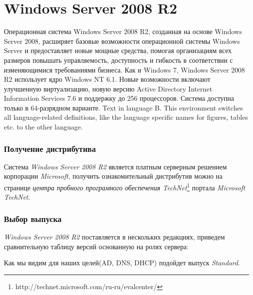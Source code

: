 \part{Windows Server 2008 R2}
Операционная система \foreignlanguage{english}{Windows Server 2008 R2}, созданная на основе \foreignlanguage{english}{Windows Server 2008}, расширяет базовые возможности операционной системы \foreignlanguage{english}{Windows Server} и предоставляет новые мощные средства, помогая организациям всех размеров повышать управляемость, доступность и гибкость в соответствии с изменяющимися требованиями бизнеса.
Как и Windows 7, Windows Server 2008 R2 использует ядро Windows NT 6.1.
Новые возможности включают улучшенную виртуализацию, новую версию \foreignlanguage{english}{Active Directory Internet Information Services 7.6} и поддержку до 256 процессоров. Система доступна только в 64-разрядном варианте.
\foreignlanguage{english}{Text in language B. This environment switches all language-related definitions, like the language specific names for figures, tables etc. to the other language.}

\section{Получение дистрибутива}
Система \textit{Windows Server 2008 R2} является платным серверным решением корпорации \textit{Microsoft}, получить ознакомительный дистрибутив можно на странице \textit{центра пробного програмного обеспечения TechNet}\footnote{http://technet.microsoft.com/ru-ru/evalcenter/} портала \textit{Microsoft TechNet}.

\section{Выбор выпуска}
\textit{Windows Server 2008 R2} поставляется в нескольких редакциях, приведем сравнительную таблицу версий основанную на ролях сервера:
\begin{figure}[H]
\end{figure}
Как мы видим для наших целей(AD, DNS, DHCP) подойдет выпуск \textit{Standard}.
\newpage
